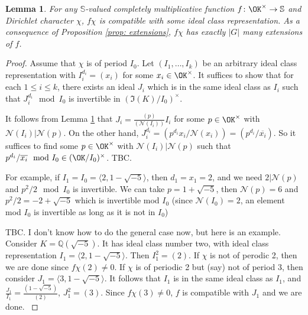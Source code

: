 \documentclass[11pt]{amsart}
\newtheorem{lemma}{Lemma}[section]
\theoremstyle{definition}
\newcommand{\NN}{{\mathcal N}}
\newcommand{\Q}{{\mathbb Q}}
\renewcommand{\S}{\mathbb{S}}
\begin{document}
 \iffalse


\begin{lemma}\label{ccf}
 For any $\S$-valued completely multiplicative function $f\colon\OK^{\times}\to\S$ and Dirichlet character $\chi$, $f\chi$ is compatible with some ideal class representation. As a consequence of Proposition \ref{prop: extensions}, $f\chi$ has exactly $\vert G\vert$ many extensions of $f$.
\end{lemma}
\begin{proof}
Assume that $\chi$ is of period $I_{0}$.
Let $(I_{1},\dots,I_{k})$ be an arbitrary ideal class representation with $I_{i}^{d_{i}}=(x_{i})$ for some $x_{i}\in \OK^{\times}$. It suffices to show that for each $1\leq i\leq k$, there exists an ideal $J_{i}$ which is in the same ideal class as $I_{i}$ such that $J_{i}^{d_{i}} \mod I_{0}$ is invertible in $(\mathfrak{I}(K)/I_{0})^{\times}$.

It follows from Lemma \ref{ccf} that $J_{i}=\frac{(p)}{(\NN(I_{i}))}I_{i}$ for some $p\in\OK^{\times}$ with $\NN(I_{i})\vert\NN(p)$.
On the other hand, $J_{i}^{d_{i}}=(p^{d_{i}}x_{i}/\NN(x_{i}))=(p^{d_{i}}/\overline{x_{i}})$.
So it suffices to find some $p\in\OK^{\times}$ with $\NN(I_{i})\vert\NN(p)$ such that $p^{d_{i}}/\overline{x_{i}} \mod I_{0} \in (\OK/I_{0})^{\times}$.  {\color{red} TBC.}


{\color{red} For example, if $I_{1}=I_{0}=\langle 2, 1-\sqrt{-5}\rangle$, then $d_{1}=x_{1}=2$, and we need $2\vert\NN(p)$ and $p^{2}/2 \mod I_{0}$ is invertible. We can take $p=1+\sqrt{-5}$, then $\NN(p)=6$ and $p^{2}/2=-2+\sqrt{-5}$ which is invertible mod $I_{0}$ (since $\NN(I_{0})=2$, an element mod $I_{0}$ is invertible as long as it is not in $I_{0}$)}
    
    {\color{red} TBC. I don't know how to do the general case now, but here is an example. Consider $K=\Q(\sqrt{-5})$. It has ideal class number two, with ideal class representation $I_{1}=\langle 2, 1-\sqrt{-5}\rangle$. Then $I_{1}^{2}=(2)$. If $\chi$ is not of perodic 2, then we are done since $f\chi(2)\neq 0$. If $\chi$ is of periodic 2 but (say) not of period 3, then consider $J_{1}=\langle 3,1-\sqrt{-5}\rangle$. It follows that $I_{1}$ is in the same ideal class as $I_{1}$, and $\frac{J_{1}}{I_{1}}=\frac{(1-\sqrt{-5})}{(2)}$, $J_{1}^{2}=(3)$. Since $f\chi(3)\neq 0$, $f$ is compatible with $J_{1}$ and we are done.
    }
\end{proof}
\end{document}
